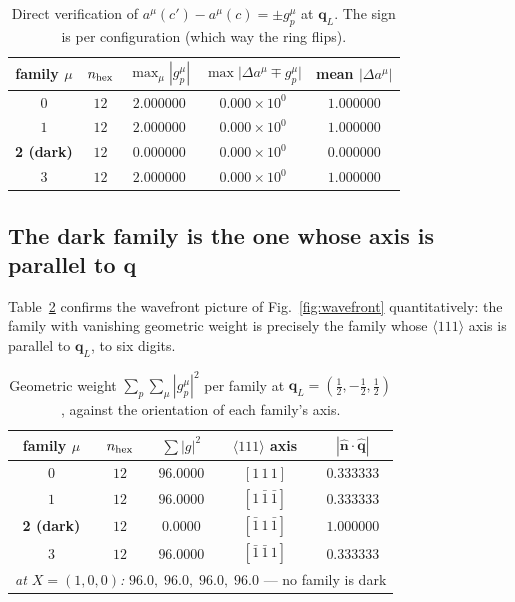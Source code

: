 \documentclass[11pt]{article}
\newcommand{\bq}{\bm q}
\begin{document}
\begin{table}[h]
\centering
\caption{Direct verification of $a^\mu(c')-a^\mu(c)=\pm g^\mu_p$ at
$\bq_L$. The sign is per configuration (which way the ring flips).}
\label{tab:flip}
\begin{tabular}{ccccc}
\toprule
family $\mu$ & $n_{\rm hex}$ & $\max_\mu|g^\mu_p|$ &
$\max\bigl|\Delta a^\mu\mp g^\mu_p\bigr|$ & mean $|\Delta a^\mu|$\\
\midrule
$0$ & $12$ & $2.000000$ & $0.000\times10^{0}$ & $1.000000$\\
$1$ & $12$ & $2.000000$ & $0.000\times10^{0}$ & $1.000000$\\
\textbf{2 (dark)} & $12$ & $\bm{0.000000}$ & $0.000\times10^{0}$
 & $\bm{0.000000}$\\
$3$ & $12$ & $2.000000$ & $0.000\times10^{0}$ & $1.000000$\\
\bottomrule
\end{tabular}
\end{table}

\subsection{The dark family is the one whose axis is parallel to
\texorpdfstring{$\bq$}{q}}

Table~\ref{tab:geom} confirms the wavefront picture of
Fig.~\ref{fig:wavefront} quantitatively: the family with vanishing
geometric weight is precisely the family whose $\langle111\rangle$ axis
is parallel to $\bq_L$, to six digits.

\begin{table}[h]
\centering
\caption{Geometric weight $\sum_p\sum_\mu|g^\mu_p|^2$ per family at
$\bq_L=(\tfrac12,-\tfrac12,\tfrac12)$, against the orientation of each
family's axis.}
\label{tab:geom}
\begin{tabular}{ccccc}
\toprule
family $\mu$ & $n_{\rm hex}$ & $\sum|g|^2$ & $\langle111\rangle$ axis &
$|\hat{\bm n}\cdot\hat{\bq}|$\\
\midrule
$0$ & $12$ & $96.0000$ & $[1\,1\,1]$ & $0.333333$\\
$1$ & $12$ & $96.0000$ & $[1\,\bar1\,\bar1]$ & $0.333333$\\
\textbf{2 (dark)} & $12$ & $\bm{0.0000}$ & $[\bar1\,1\,\bar1]$ &
 $\bm{1.000000}$\\
$3$ & $12$ & $96.0000$ & $[\bar1\,\bar1\,1]$ & $0.333333$\\
\midrule
\multicolumn{5}{l}{\emph{at $X=(1,0,0)$:}\quad
$96.0,\;96.0,\;96.0,\;96.0$ \quad --- no family is dark}\\
\bottomrule
\end{tabular}
\end{table}
\end{document}
